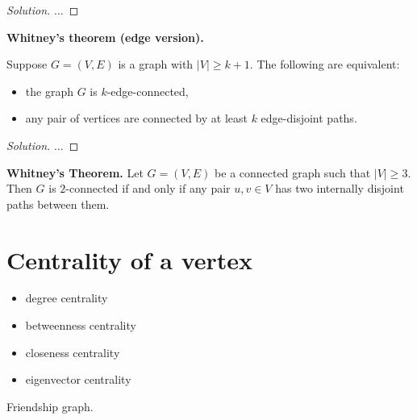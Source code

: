 \begin{proof}[Solution]

...

\end{proof}



\begin{theorem}
\textbf{Whitney's theorem (edge version).}
{\rm
Suppose $G=(V,E)$ is a graph with $|V|\geq k+1$. The following are
equivalent:
\begin{itemize}
\item
the graph $G$ is $k$-edge-connected,

\item
any pair of
vertices are connected by at least $k$ edge-disjoint paths.
\end{itemize}
}
\end{theorem}

\begin{proof}[Solution]

...

\end{proof}


\begin{theorem}
\textbf{Whitney's Theorem.}
Let $G = (V, E)$ be a connected graph such that $|V| \geq 3$. Then $G$
is $2$-connected if and only if any pair $u,v \in V$ has two
internally disjoint paths between them.
\end{theorem}



\section{Centrality of a vertex}

\begin{itemize}
\item degree centrality

\item betweenness centrality

\item closeness centrality

\item eigenvector centrality
\end{itemize}

\begin{algorithm}[!htbp]

\caption{Friendship graph.}
\label{alg:distance_connectivity:friendship_graphs}
\end{algorithm}


